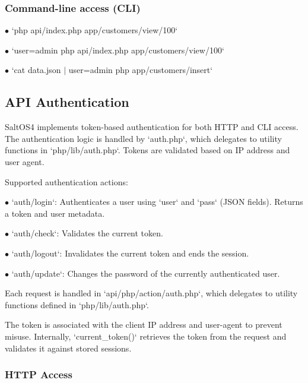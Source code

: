 \documentclass[a4paper]{article}
\begin{document}
\hypertarget{toc22}{}
\subsubsection{Command-line access (CLI)}

\begin{compactitem}
\item[\color{myblue}$\bullet$] `php api/index.php app/customers/view/100`
\item[\color{myblue}$\bullet$] `user=admin php api/index.php app/customers/view/100`
\item[\color{myblue}$\bullet$] `cat data.json $|$ user=admin php app/customers/insert`
\end{compactitem}

\hypertarget{toc23}{}
\subsection{API Authentication}

SaltOS4 implements token-based authentication for both HTTP and CLI access. The authentication logic is handled by `auth.php`, which delegates to utility functions in `php/lib/auth.php`. Tokens are validated based on IP address and user agent.

Supported authentication actions:

\begin{compactitem}
\item[\color{myblue}$\bullet$] `auth/login`: Authenticates a user using `user` and `pass` (JSON fields). Returns a token and user metadata.
\item[\color{myblue}$\bullet$] `auth/check`: Validates the current token.
\item[\color{myblue}$\bullet$] `auth/logout`: Invalidates the current token and ends the session.
\item[\color{myblue}$\bullet$] `auth/update`: Changes the password of the currently authenticated user.
\end{compactitem}

Each request is handled in `api/php/action/auth.php`, which delegates to utility functions defined in `php/lib/auth.php`.

The token is associated with the client IP address and user-agent to prevent misuse. Internally, `current\_token()` retrieves the token from the request and validates it against stored sessions.

\hypertarget{toc24}{}
\subsubsection{HTTP Access}
\end{document}
